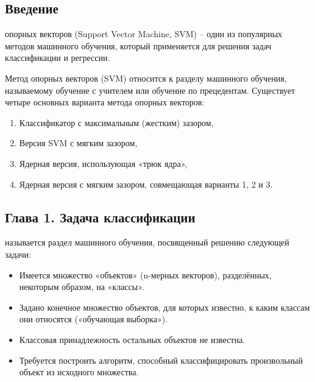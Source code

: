 \documentclass[a4paper,14pt]{article} %
\begin{document}
\begin{center}
\section*{Введение}
\end{center}
 опорных векторов (Support Vector Machine, SVM) – один из
популярных методов машинного обучения, который применяется для решения
задач классификации и регрессии.

Метод опорных векторов (SVM) относится к разделу машинного обучения,
называемому обучение с учителем или обучение по прецедентам. Существует четыре основных варианта метода опорных векторов:\\
\begin{enumerate}
    \item Классификатор с максимальным (жестким) зазором,
    \item Версия SVM с мягким зазором,
    \item Ядерная версия, использующая «трюк ядра»,
    \item Ядерная версия с мягким зазором, совмещающая варианты 1, 2 и 3.
\end{enumerate}
\newpage
\setcounter{subsection}{0}
\setcounter{equation}{0}
\setcounter{section}{0}

\begin{center}
\section*{Глава 1. Задача классификации}
\end{center}
 называется раздел машинного обучения, посвященный решению
следующей задачи:\\
\begin{itemize}
    \item Имеется множество «объектов» (n-мерных векторов), разделённых,
некоторым образом, на «классы».
    \item Задано конечное множество объектов, для которых известно, к каким
классам они относятся («обучающая выборка»).
    \item Классовая принадлежность остальных объектов не известна.
    \item Требуется построить алгоритм, способный классифицировать
произвольный объект из исходного множества.
\end{itemize}
\newpage
\setcounter{subsection}{0}
\setcounter{equation}{0}
\setcounter{section}{0}
\end{document}
